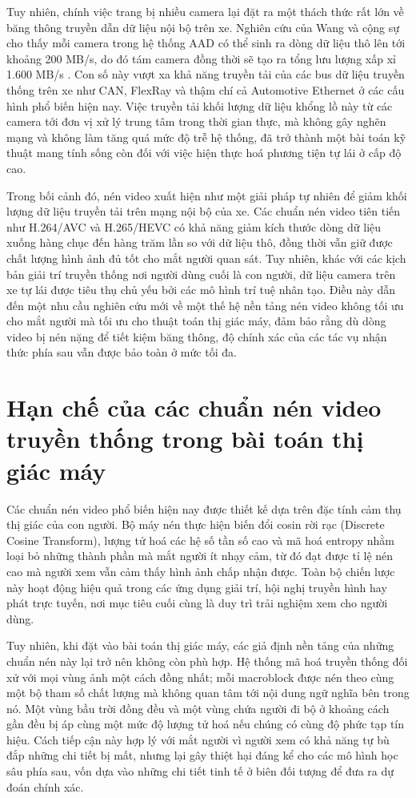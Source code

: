 Tuy nhiên, chính việc trang bị nhiều camera lại đặt ra một thách thức rất lớn về băng thông truyền dẫn dữ liệu nội bộ trên xe. Nghiên cứu của Wang và cộng sự cho thấy mỗi camera trong hệ thống AAD có thể sinh ra dòng dữ liệu thô lên tới khoảng 200 MB/s, do đó tám camera đồng thời sẽ tạo ra tổng lưu lượng xấp xỉ 1.600 MB/s \cite{SAC}. Con số này vượt xa khả năng truyền tải của các bus dữ liệu truyền thống trên xe như CAN, FlexRay và thậm chí cả Automotive Ethernet ở các cấu hình phổ biến hiện nay. Việc truyền tải khối lượng dữ liệu khổng lồ này từ các camera tới đơn vị xử lý trung tâm trong thời gian thực, mà không gây nghẽn mạng và không làm tăng quá mức độ trễ hệ thống, đã trở thành một bài toán kỹ thuật mang tính sống còn đối với việc hiện thực hoá phương tiện tự lái ở cấp độ cao.

Trong bối cảnh đó, nén video xuất hiện như một giải pháp tự nhiên để giảm khối lượng dữ liệu truyền tải trên mạng nội bộ của xe. Các chuẩn nén video tiên tiến như H.264/AVC và H.265/HEVC có khả năng giảm kích thước dòng dữ liệu xuống hàng chục đến hàng trăm lần so với dữ liệu thô, đồng thời vẫn giữ được chất lượng hình ảnh đủ tốt cho mắt người quan sát. Tuy nhiên, khác với các kịch bản giải trí truyền thống nơi người dùng cuối là con người, dữ liệu camera trên xe tự lái được tiêu thụ chủ yếu bởi các mô hình trí tuệ nhân tạo. Điều này dẫn đến một nhu cầu nghiên cứu mới về một thế hệ nền tảng nén video không tối ưu cho mắt người mà tối ưu cho thuật toán thị giác máy, đảm bảo rằng dù dòng video bị nén nặng để tiết kiệm băng thông, độ chính xác của các tác vụ nhận thức phía sau vẫn được bảo toàn ở mức tối đa.

\section{Hạn chế của các chuẩn nén video truyền thống trong bài toán thị giác máy}

Các chuẩn nén video phổ biến hiện nay được thiết kế dựa trên đặc tính cảm thụ thị giác của con người. Bộ máy nén thực hiện biến đổi cosin rời rạc (Discrete Cosine Transform), lượng tử hoá các hệ số tần số cao và mã hoá entropy nhằm loại bỏ những thành phần mà mắt người ít nhạy cảm, từ đó đạt được tỉ lệ nén cao mà người xem vẫn cảm thấy hình ảnh chấp nhận được. Toàn bộ chiến lược này hoạt động hiệu quả trong các ứng dụng giải trí, hội nghị truyền hình hay phát trực tuyến, nơi mục tiêu cuối cùng là duy trì trải nghiệm xem cho người dùng.

Tuy nhiên, khi đặt vào bài toán thị giác máy, các giả định nền tảng của những chuẩn nén này lại trở nên không còn phù hợp. Hệ thống mã hoá truyền thống đối xử với mọi vùng ảnh một cách đồng nhất; mỗi macroblock được nén theo cùng một bộ tham số chất lượng mà không quan tâm tới nội dung ngữ nghĩa bên trong nó. Một vùng bầu trời đồng đều và một vùng chứa người đi bộ ở khoảng cách gần đều bị áp cùng một mức độ lượng tử hoá nếu chúng có cùng độ phức tạp tín hiệu. Cách tiếp cận này hợp lý với mắt người vì người xem có khả năng tự bù đắp những chi tiết bị mất, nhưng lại gây thiệt hại đáng kể cho các mô hình học sâu phía sau, vốn dựa vào những chi tiết tinh tế ở biên đối tượng để đưa ra dự đoán chính xác.


